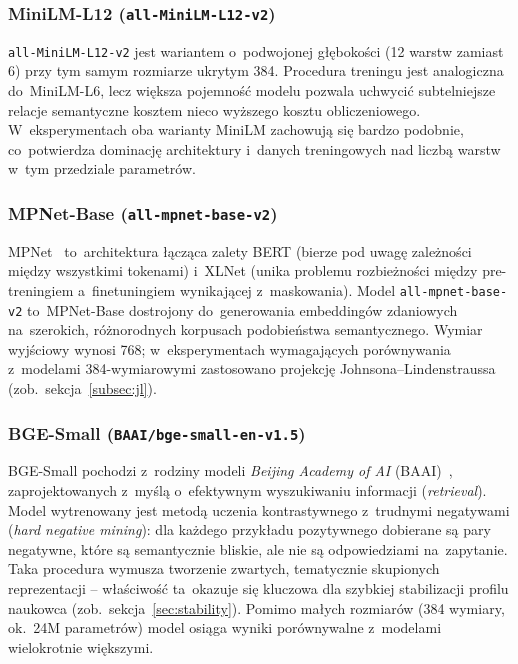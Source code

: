 \subsubsection{MiniLM-L12 (\texttt{all-MiniLM-L12-v2})}

\texttt{all-MiniLM-L12-v2} jest wariantem o~podwojonej głębokości
(12 warstw zamiast 6) przy tym samym rozmiarze ukrytym 384.
Procedura treningu jest analogiczna do~MiniLM-L6,
lecz większa pojemność modelu pozwala uchwycić subtelniejsze
relacje semantyczne kosztem nieco wyższego kosztu obliczeniowego.
W~eksperymentach oba warianty MiniLM zachowują się bardzo podobnie,
co~potwierdza dominację architektury i~danych treningowych
nad liczbą warstw w~tym przedziale parametrów.

\subsubsection{MPNet-Base (\texttt{all-mpnet-base-v2})}

MPNet~\cite{mpnet2020} to~architektura łącząca zalety BERT
(bierze pod uwagę zależności między wszystkimi tokenami)
i~XLNet (unika problemu rozbieżności między pre-treningiem
a~finetuningiem wynikającej z~maskowania).
Model \texttt{all-mpnet-base-v2} to~MPNet-Base
dostrojony do~generowania embeddingów zdaniowych na~szerokich,
różnorodnych korpusach podobieństwa semantycznego.
Wymiar wyjściowy wynosi 768; w~eksperymentach wymagających
porównywania z~modelami 384-wymiarowymi zastosowano
projekcję Johnsona--Lindenstraussa (zob.\ sekcja~\ref{subsec:jl}).

\subsubsection{BGE-Small (\texttt{BAAI/bge-small-en-v1.5})}

BGE-Small pochodzi z~rodziny modeli \textit{Beijing Academy of AI}
(BAAI)~\cite{bge2023}, zaprojektowanych z~myślą o~efektywnym
wyszukiwaniu informacji (\textit{retrieval}).
Model wytrenowany jest metodą uczenia kontrastywnego
z~trudnymi negatywami (\textit{hard negative mining}):
dla każdego przykładu pozytywnego dobierane są pary negatywne,
które są semantycznie bliskie, ale nie są odpowiedziami na~zapytanie.
Taka procedura wymusza tworzenie zwartych, tematycznie skupionych
reprezentacji -- właściwość ta~okazuje się kluczowa
dla szybkiej stabilizacji profilu naukowca
(zob.\ sekcja~\ref{sec:stability}).
Pomimo małych rozmiarów (384 wymiary, ok.~24M parametrów)
model osiąga wyniki porównywalne z~modelami wielokrotnie większymi.

